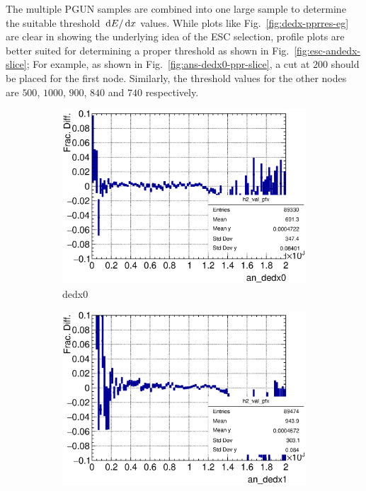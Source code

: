    The multiple PGUN samples are combined into one large sample to determine the suitable threshold $\,\textrm{d}E/\,\textrm{d}x$ values.
   While plots like Fig.~\ref{fig:dedx-pprres-eg} are clear in showing the underlying idea of the ESC selection, profile plots are better suited for determining a proper threshold as shown in Fig.~\ref{fig:esc-andedx-slice};
   For example, as shown in Fig.~\ref{fig:ans-dedx0-ppr-slice}, a cut at $200$ should be placed for the first node.
   Similarly, the threshold values for the other nodes are $500$, $1000$, $900$, $840$ and $740$ respectively.
   \begin{figure}[t]
       \centering
       \begin{subfigure}{\trfigwid\textwidth}
            \includegraphics[width=\textwidth]{figures/sel/ans_dedx0_vs_p_pr_res_hist2d_al2_selpr_con_slice.eps}
            \caption{dedx0}
            \label{subfig:ans-dedx0-ppr-slice}
       \end{subfigure}
       \begin{subfigure}{\trfigwid\textwidth}
            \includegraphics[width=\textwidth]{figures/sel/ans_dedx1_vs_p_pr_res_hist2d_al2_selpr_con_slice.eps}

\end{subfigure}
\end{figure}
